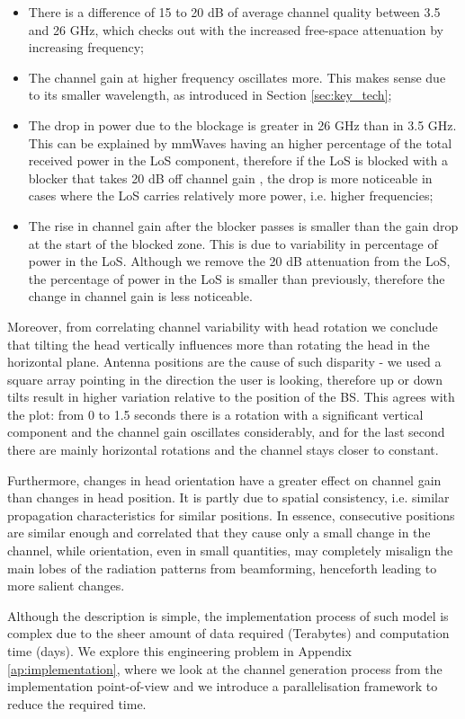\begin{itemize}
    \item There is a difference of 15 to 20 dB of average channel quality between 3.5 and 26 GHz, which checks out with the increased free-space attenuation by increasing frequency;
    \item The channel gain at higher frequency oscillates more. This makes sense due to its smaller wavelength, as introduced in Section \ref{sec:key_tech};
    \item The drop in power due to the blockage is greater in 26 GHz than in 3.5 GHz. This can be explained by mmWaves having an higher percentage of the total received power in the LoS component, therefore if the LoS is blocked with a blocker that takes 20 dB off channel gain \cite{20db_attenuation}, the drop is more noticeable in cases where the LoS carries relatively more power, i.e. higher frequencies;
    \item The rise in channel gain after the blocker passes is smaller than the gain drop at the start of the blocked zone. This is due to variability in percentage of power in the LoS. Although we remove the 20 dB attenuation from the LoS, the percentage of power in the LoS is smaller than previously, therefore the change in channel gain is less noticeable.
\end{itemize}



Moreover, from correlating channel variability with head rotation we conclude that tilting the head vertically influences more than rotating the head in the horizontal plane. Antenna positions are the cause of such disparity - we used a square array pointing in the direction the user is looking, therefore up or down tilts result in higher variation relative to the position of the BS. This agrees with the plot: from 0 to  1.5 seconds there is a rotation with a significant vertical component and the channel gain oscillates considerably, and for the last second there are mainly horizontal rotations and the channel stays closer to constant.

Furthermore, changes in head orientation have a greater effect on channel gain than changes in head position. It is partly due to spatial consistency, i.e. similar propagation characteristics for similar positions. In essence, consecutive positions are similar enough and correlated that they cause only a small change in the channel, while orientation, even in small quantities, may completely misalign the main lobes of the radiation patterns from beamforming, henceforth leading to more salient changes.


Although the description is simple, the implementation process of such model is complex due to the sheer amount of data required (Terabytes) and computation time (days). We explore this engineering problem in Appendix \ref{ap:implementation}, where we look at the channel generation process from the implementation point-of-view and we introduce a parallelisation framework to reduce the required time.